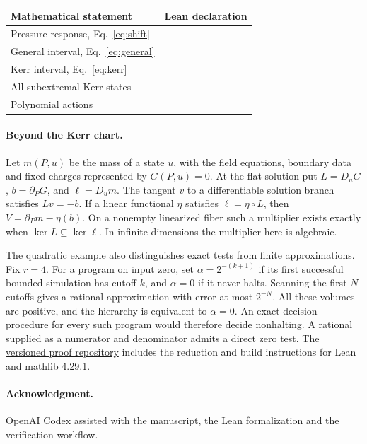 \documentclass[11pt,a4paper]{article}
\newcommand{\repo}{https://github.com/nktkt/blackhole}
\newcommand{\proofref}[3]{\href{\repo/blob/kerr-volume-hierarchy-v1/BlackHole/#1.lean\#L#3}{\texttt{\detokenize{#2}}}}
\begin{document}
\begin{center}
\small
\begin{tabular}{@{}ll@{}}
\toprule
Mathematical statement & Lean declaration \\
\midrule
Pressure response, Eq.~\eqref{eq:shift} & \proofref{ScalarCurvatureGravity}{volume_shift}{144}\\
General interval, Eq.~\eqref{eq:general} & \proofref{ScalarCurvatureGravity}{hierarchy_iff_second}{197}\\
Kerr interval, Eq.~\eqref{eq:kerr} & \proofref{KerrScalarCurvature}{kerr_iff}{97}\\
All subextremal Kerr states & \proofref{KerrScalarCurvature}{all_kerr_iff}{159}\\
Polynomial actions & \proofref{KerrScalarCurvature}{all_kerr_polynomial_iff}{179}\\
\bottomrule
\end{tabular}
\end{center}

\paragraph{Beyond the Kerr chart.}
Let \(m(P,u)\) be the mass of a state \(u\), with the field equations, boundary data and fixed charges represented by \(G(P,u)=0\). At the flat solution put \(L=D_uG\), \(b=\partial_PG\), and \(\ell=D_um\). The tangent \(v\) to a differentiable solution branch satisfies \(Lv=-b\). If a linear functional \(\eta\) satisfies \(\ell=\eta\circ L\), then \(V=\partial_Pm-\eta(b)\). On a nonempty linearized fiber such a multiplier exists exactly when \(\ker L\subseteq\ker\ell\). In infinite dimensions the multiplier here is algebraic.

The quadratic example also distinguishes exact tests from finite approximations. Fix \(r=4\). For a program on input zero, set \(\alpha=2^{-(k+1)}\) if its first successful bounded simulation has cutoff \(k\), and \(\alpha=0\) if it never halts. Scanning the first \(N\) cutoffs gives a rational approximation with error at most \(2^{-N}\). All these volumes are positive, and the hierarchy is equivalent to \(\alpha=0\). An exact decision procedure for every such program would therefore decide nonhalting. A rational supplied as a numerator and denominator admits a direct zero test. The \href{\repo/tree/kerr-volume-hierarchy-v1}{versioned proof repository} includes the reduction and build instructions for Lean and mathlib 4.29.1.

\paragraph{Acknowledgment.}
OpenAI Codex assisted with the manuscript, the Lean formalization and the verification workflow.
\end{document}
